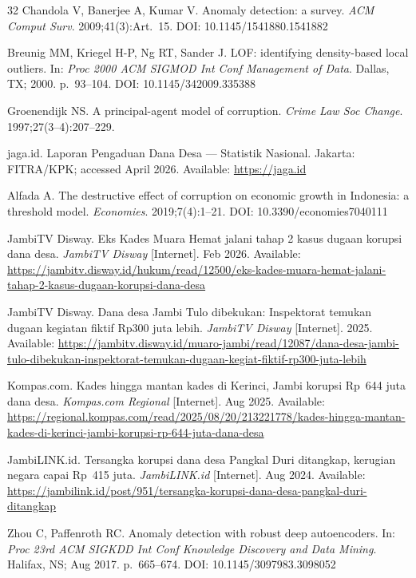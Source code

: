 \documentclass[3p,times,procedia]{elsarticle}
\begin{document}
\begin{thebibliography}{32}
Chandola V, Banerjee A, Kumar V. Anomaly detection: a survey. \textit{ACM Comput Surv}. 2009;41(3):Art.~15. DOI: 10.1145/1541880.1541882

Breunig MM, Kriegel H-P, Ng RT, Sander J. LOF: identifying density-based local outliers. In: \textit{Proc 2000 ACM SIGMOD Int Conf Management of Data}. Dallas, TX; 2000. p.\ 93--104. DOI: 10.1145/342009.335388

Groenendijk NS. A principal-agent model of corruption. \textit{Crime Law Soc Change}. 1997;27(3--4):207--229.

jaga.id. Laporan Pengaduan Dana Desa --- Statistik Nasional. Jakarta: FITRA/KPK; accessed April 2026. Available: \url{https://jaga.id}

Alfada A. The destructive effect of corruption on economic growth in Indonesia: a threshold model. \textit{Economies}. 2019;7(4):1--21. DOI: 10.3390/economies7040111

JambiTV Disway. Eks Kades Muara Hemat jalani tahap 2 kasus dugaan korupsi dana desa. \textit{JambiTV Disway} [Internet]. Feb 2026. Available: \url{https://jambitv.disway.id/hukum/read/12500/eks-kades-muara-hemat-jalani-tahap-2-kasus-dugaan-korupsi-dana-desa}

JambiTV Disway. Dana desa Jambi Tulo dibekukan: Inspektorat temukan dugaan kegiatan fiktif Rp300 juta lebih. \textit{JambiTV Disway} [Internet]. 2025. Available: \url{https://jambitv.disway.id/muaro-jambi/read/12087/dana-desa-jambi-tulo-dibekukan-inspektorat-temukan-dugaan-kegiat-fiktif-rp300-juta-lebih}

Kompas.com. Kades hingga mantan kades di Kerinci, Jambi korupsi Rp~644 juta dana desa. \textit{Kompas.com Regional} [Internet]. Aug 2025. Available: \url{https://regional.kompas.com/read/2025/08/20/213221778/kades-hingga-mantan-kades-di-kerinci-jambi-korupsi-rp-644-juta-dana-desa}

JambiLINK.id. Tersangka korupsi dana desa Pangkal Duri ditangkap, kerugian negara capai Rp~415 juta. \textit{JambiLINK.id} [Internet]. Aug 2024. Available: \url{https://jambilink.id/post/951/tersangka-korupsi-dana-desa-pangkal-duri-ditangkap}

Zhou C, Paffenroth RC. Anomaly detection with robust deep autoencoders. In: \textit{Proc 23rd ACM SIGKDD Int Conf Knowledge Discovery and Data Mining}. Halifax, NS; Aug 2017. p.\ 665--674. DOI: 10.1145/3097983.3098052

\end{thebibliography}
\end{document}
